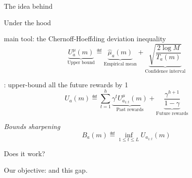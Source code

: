 \documentclass{beamer}
\begin{document}
\begin{frame}{The idea behind \OLOP}
\begin{center}

\end{center}
\end{frame}

\begin{frame}{Under the hood}
    \begin{block}{\OLOP main tool: the Chernoff-Hoeffding deviation inequality}
        \begin{equation*}
             \underbrace{U^{\mu}_a(m)}_{\text{Upper bound}} \eqdef \underbrace{\hat{\mu}_a(m)}_{\text{Empirical mean}} + \underbrace{\sqrt{\frac{2 \log M}{T_a(m)}}}_{\text{Confidence interval}}
        \end{equation*}
    \end{block}
    \pause
    
    \begin{block}{\OPD: upper-bound all the future rewards by 1}
    \begin{equation*}
    \label{eq:Ua}
        U_a(m) \eqdef \sum_{t=1}^h \underbrace{\gamma^t U^{\mu}_{a_{1:t}}(m)}_{\text{Past rewards}} + \underbrace{\frac{\gamma^{h+1}}{1-\gamma}}_{\text{Future rewards}}
    \end{equation*}
    \end{block}
    \pause
    
    \begin{block}{\emph{Bounds sharpening}}
    \begin{equation*}
    \label{eq:Ba}
        B_a(m) \eqdef \inf_{1 \leq t \leq L} U_{a_{1:t}}(m)
    \end{equation*}
    \end{block}
\end{frame}

\begin{frame}{Does it work?}
\begin{center}
    
    Our objective:  and  this gap.
\end{center}
\end{frame}
\end{document}
